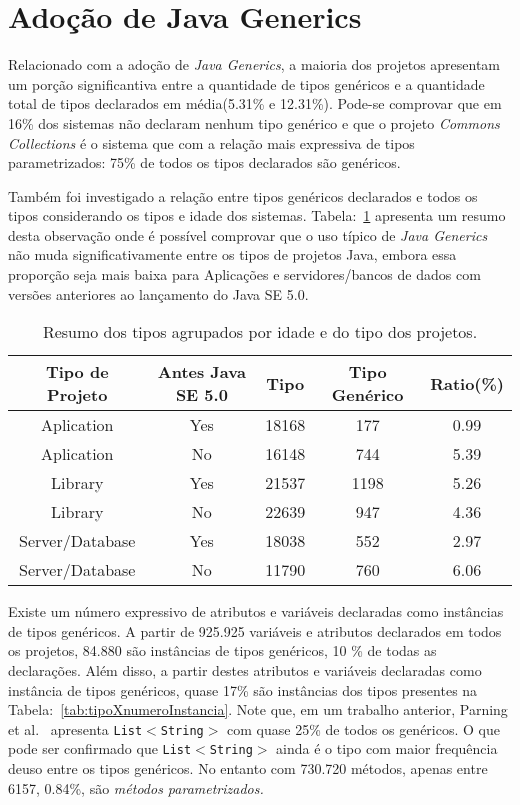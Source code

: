 
\section{Adoção de Java Generics}
Relacionado com a adoção de \textit{Java Generics}, a maioria dos projetos apresentam um porção significantiva entre a quantidade de tipos genéricos e a quantidade total de tipos declarados em média(5.31\% e 12.31\%). Pode-se comprovar que em 16\% dos sistemas não declaram nenhum tipo genérico e que o projeto \textit{Commons Collections} é o sistema que com a relação mais expressiva de tipos parametrizados: 75\% de todos os tipos declarados são genéricos.

Também foi investigado a relação entre tipos genéricos declarados e todos os tipos considerando os tipos e idade dos sistemas. Tabela:~\ref{tab:std} apresenta um resumo desta observação onde é possível comprovar que o uso típico de  \textit{Java Generics} não muda significativamente entre os tipos de projetos Java, embora essa proporção seja mais baixa para Aplicações e servidores/bancos de dados com versões anteriores ao lançamento do Java SE 5.0.

\begin{table}[h!]
	\centering
	\caption{Resumo dos tipos agrupados por idade e do tipo dos projetos.}
	\begin{tabular}{ccccc} \hline 
		Tipo de Projeto & Antes Java SE 5.0 & Tipo & Tipo Genérico & Ratio(\%) \\ \hline\hline
		Aplication & Yes & 18168 & 177 & 0.99 \\
		Aplication & No & 16148 & 744 & 5.39 \\
		Library & Yes & 21537 & 1198 & 5.26 \\
		Library & No & 22639 & 947 & 4.36 \\
		Server/Database & Yes & 18038 & 552 & 2.97 \\ 
		Server/Database & No & 11790 & 760 & 6.06 \\ \hline
	\end{tabular}
	\label{tab:std} %
\end{table}


Existe um número expressivo de atributos e variáveis declaradas como instâncias de tipos genéricos. A partir de 925.925 variáveis e atributos declarados em todos os projetos, 84.880 são instâncias de tipos genéricos, 10 \% de todas as declarações. Além disso, a partir destes atributos e variáveis declaradas como instância de tipos genéricos, quase 17\% são instâncias dos tipos presentes na Tabela:~\ref{tab:tipoXnumeroInstancia}. Note que, em um trabalho anterior, Parning et al.~\cite{Parnin:ACM2011} apresenta \texttt{List$<$String$>$} com quase 25\% de todos os genéricos. O que pode ser confirmado que \texttt{List$<$String$>$} ainda é o tipo com maior frequência deuso entre os tipos genéricos. No entanto com 730.720 métodos, apenas entre 6157, 0.84\%, são \emph{métodos parametrizados.}

